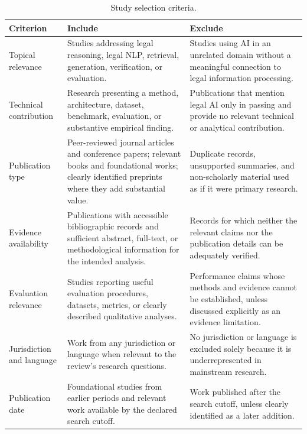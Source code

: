 \begin{table}[t]
\centering
\caption{Study selection criteria.}
\label{tab:criteria}
\footnotesize
\setlength{\tabcolsep}{5pt}
\renewcommand{\arraystretch}{1.3}
\begin{tabularx}{\textwidth}{>{\raggedright\arraybackslash}p{2.7cm} >{\raggedright\arraybackslash}X >{\raggedright\arraybackslash}X}
\toprule
\textbf{Criterion} & \textbf{Include} & \textbf{Exclude} \\
\midrule
Topical relevance & Studies addressing legal reasoning, legal NLP, retrieval, generation, verification, or evaluation. & Studies using AI in an unrelated domain without a meaningful connection to legal information processing. \\
Technical contribution & Research presenting a method, architecture, dataset, benchmark, evaluation, or substantive empirical finding. & Publications that mention legal AI only in passing and provide no relevant technical or analytical contribution. \\
Publication type & Peer-reviewed journal articles and conference papers; relevant books and foundational works; clearly identified preprints where they add substantial value. & Duplicate records, unsupported summaries, and non-scholarly material used as if it were primary research. \\
Evidence availability & Publications with accessible bibliographic records and sufficient abstract, full-text, or methodological information for the intended analysis. & Records for which neither the relevant claims nor the publication details can be adequately verified. \\
Evaluation relevance & Studies reporting useful evaluation procedures, datasets, metrics, or clearly described qualitative analyses. & Performance claims whose methods and evidence cannot be established, unless discussed explicitly as an evidence limitation. \\
Jurisdiction and language & Work from any jurisdiction or language when relevant to the review's research questions. & No jurisdiction or language is excluded solely because it is underrepresented in mainstream research. \\
Publication date & Foundational studies from earlier periods and relevant work available by the declared search cutoff. & Work published after the search cutoff, unless clearly identified as a later addition. \\
\bottomrule
\end{tabularx}
\end{table}

